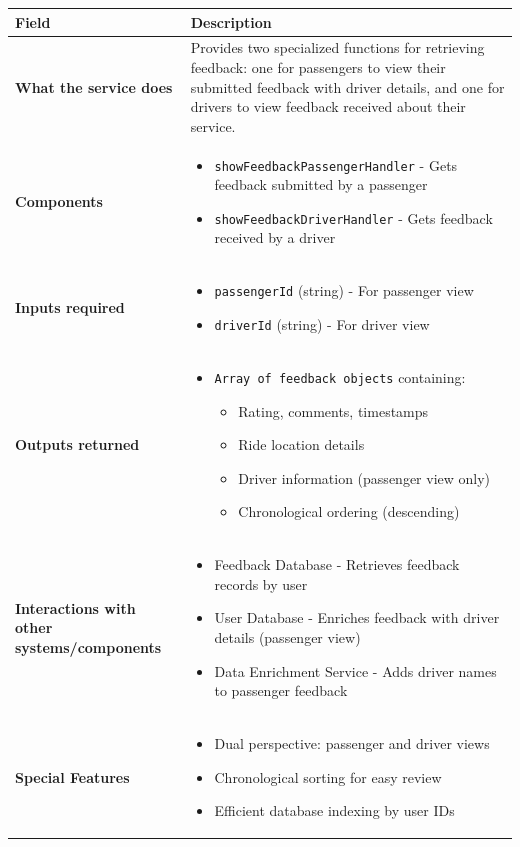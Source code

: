 \documentclass[11pt,a4paper]{article}
\begin{document}
\begin{longtable}{|p{4cm}|p{12cm}|}
\hline
\textbf{Field} & \textbf{Description} \\
\hline
\textbf{What the service does} & 
Provides two specialized functions for retrieving feedback: one for passengers to view their submitted feedback with driver details, and one for drivers to view feedback received about their service. \\
\hline
\textbf{Components} & 
\begin{itemize}[nosep]
\item \texttt{showFeedbackPassengerHandler} - Gets feedback submitted by a passenger
\item \texttt{showFeedbackDriverHandler} - Gets feedback received by a driver
\end{itemize} \\
\hline
\textbf{Inputs required} & 
\begin{itemize}[nosep]
\item \texttt{passengerId} (string) - For passenger view
\item \texttt{driverId} (string) - For driver view
\end{itemize} \\
\hline
\textbf{Outputs returned} & 
\begin{itemize}[nosep]
\item \texttt{Array of feedback objects} containing:
  \begin{itemize}[nosep]
  \item Rating, comments, timestamps
  \item Ride location details
  \item Driver information (passenger view only)
  \item Chronological ordering (descending)
  \end{itemize}
\end{itemize} \\
\hline
\textbf{Interactions with other systems/components} & 
\begin{itemize}[nosep]
\item Feedback Database - Retrieves feedback records by user
\item User Database - Enriches feedback with driver details (passenger view)
\item Data Enrichment Service - Adds driver names to passenger feedback
\end{itemize} \\
\hline
\textbf{Special Features} & 
\begin{itemize}[nosep]
\item Dual perspective: passenger and driver views
\item Chronological sorting for easy review
\item Efficient database indexing by user IDs
\end{itemize} \\
\hline
\end{longtable}
\end{document}
